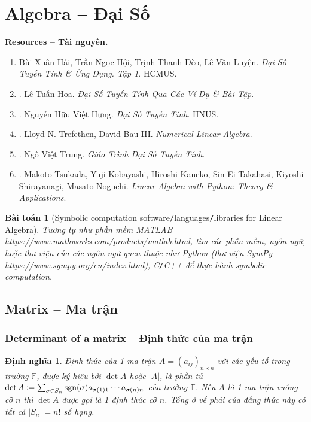 \documentclass{article}
\newtheorem{baitoan}{Bài toán}
\newtheorem{dinhnghia}{Định nghĩa}
\begin{document}

\section{Algebra -- Đại Số}
\label{sect: algebra}
\textbf{\textsf{Resources -- Tài nguyên.}}
\begin{enumerate}
	\item {\sc Bùi Xuân Hải, Trần Ngọc Hội, Trịnh Thanh Đèo, Lê Văn Luyện}. {\it Đại Số Tuyến Tính \& Ứng Dụng. Tập 1}. HCMUS.
	\item \cite{Hoa_linear_algebra}. {\sc Lê Tuấn Hoa}. {\it Đại Số Tuyến Tính Qua Các Ví Dụ \& Bài Tập}.
	\item \cite{Hung_linear_algebra}. {\sc Nguyễn Hữu Việt Hưng}. {\it Đại Số Tuyến Tính}. HNUS.
	\item \cite{Trefethen_Bau1997,Trefethen_Bau2022}. {\sc Lloyd N. Trefethen, David Bau III}. {\it Numerical Linear Algebra}.
	\item \cite{Trung_linear_algebra}. {\sc Ngô Việt Trung}. {\it Giáo Trình Đại Số Tuyến Tính}.
	\item \cite{Tsukada_Kobayashi_Kaneko_Takahasi_Shirayanagi_Noguchi2023}. {\sc Makoto Tsukada, Yuji Kobayashi, Hiroshi Kaneko, Sin-Ei Takahasi, Kiyoshi Shirayanagi, Masato Noguchi}. {\it Linear Algebra with Python: Theory \& Applications}.
\end{enumerate}

\begin{baitoan}[Symbolic computation software{\tt/}languages{\tt/}libraries for Linear Algebra]
	Tương tự như phần mềm {\sf MATLAB} \url{https://www.mathworks.com/products/matlab.html}, tìm các phần mềm, ngôn ngữ, hoặc thư viện của các ngôn ngữ quen thuộc như {\sf Python} (thư viện {\sf SymPy} \url{https://www.sympy.org/en/index.html}), {\sf C{\tt/}C++} để thực hành symbolic computation.
\end{baitoan}


\subsection{Matrix -- Ma trận}

\subsubsection{Determinant of a matrix -- Định thức của ma trận}
\begin{dinhnghia}
	{\rm Định thức} của 1 ma trận $A = (a_{ij})_{n\times n}$ với các yếu tố trong trường $\mathbb{F}$, được ký hiệu bởi $\det A$ hoặc $|A|$, là phần tử $\det A\coloneqq\sum_{\sigma\in S_n} {\rm sgn}(\sigma)a_{\sigma(1)1}\cdots a_{\sigma(n)n}$ của trường $\mathbb{F}$. Nếu $A$ là 1 ma trận vuông cỡ $n$ thì $\det A$ được gọi là 1 {\rm định thức cỡ $n$}. Tổng ở vế phải của đẳng thức này có tất cả $|S_n| = n!$ số hạng.
\end{dinhnghia}
\end{document}
